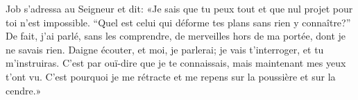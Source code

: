 Job s’adressa au Seigneur et dit:
	«Je sais que tu peux tout et que nul projet pour toi n’est impossible.
“Quel est celui qui déforme tes plans sans rien y connaître?”
De fait, j’ai parlé, sans les comprendre,
	de merveilles hors de ma portée, dont je ne savais rien.
Daigne écouter, et moi, je parlerai;
	je vais t’interroger, et tu m’instruiras.
C’est par ouï-dire que je te connaissais, mais maintenant mes yeux t’ont vu.
C’est pourquoi je me rétracte et me repens sur la poussière et sur la cendre.»
